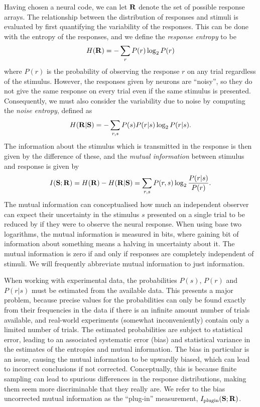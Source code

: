 Having chosen a neural code, we can let $\mathbf{R}$ denote the set of possible response arrays.
The relationship between the distribution of responses and stimuli is evaluated by first quantifying the variability of the responses.
This can be done with the entropy \cite{Shannon1948} of the responses, and we define the \textit{response entropy} to be
\begin{equation}
H( \mathbf{R} )
= - \sum_{r} P(r) \log_2 P(r)
\end{equation}
where $P(r)$ is the probability of observing the response $r$ on any trial regardless of the stimulus.
However, the responses given by neurons are ``noisy'', so they do not give the same response on every trial even if the same stimulus is presented.
Consequently, we must also consider the variability due to noise by computing the \textit{noise entropy}, defined as
\begin{equation}
H( \mathbf{R} | \mathbf{S} )
= - \sum_{r,s} P(s) P(r|s) \log_2 P(r|s)
.\end{equation}
The information about the stimulus which is transmitted in the response is then given by the difference of these, and the \textit{mutual information} between stimulus and response is given by
\begin{equation}
I( \mathbf{S} ; \mathbf{R} )
= H( \mathbf{R} ) - H( \mathbf{R} | \mathbf{S} )
= \sum_{r,s} P(r,s) \log_2 \frac{P(r|s)}{P(r)}
.\end{equation}
The mutual information can conceptualised how much an independent observer can expect their uncertainty in the stimulus $s$ presented on a single trial to be reduced by if they were to observe the neural response. When using base two logarithms, the mutual information is measured in bits, where gaining \unit[1]{bit} of information about something means a halving in uncertainty about it.
The mutual information is zero if and only if responses are completely independent of stimuli.
We will frequently abbreviate mutual information to just information.

When working with experimental data, the probabilities $P(s)$, $P(r)$ and $P(r|s)$ must be estimated from the available data.
This presents a major problem, because precise values for the probabilities can only be found exactly from their frequencies in the data if there is an infinite amount number of trials available, and real-world experiments (somewhat inconveniently) contain only a limited number of trials.
The estimated probabilities are subject to statistical error, leading to an associated systematic error (bias) and statistical variance in the estimates of the entropies and mutual information. The bias in particular is an issue, causing the mutual information to be upwardly biased, which can lead to incorrect conclusions if not corrected. Conceptually, this is because finite sampling can lead to spurious differences in the response distributions, making them seem more discriminable that they really are.
We refer to the bias uncorrected mutual information as the ``plug-in'' measurement, $I_{\text{plugin}}(\mathbf{S};\mathbf{R})$.

